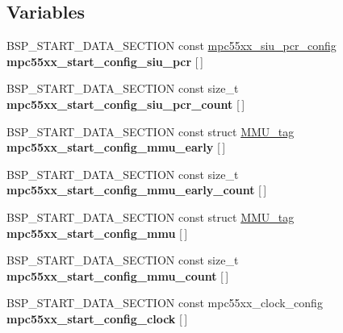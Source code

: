 \subsection*{Variables}
\begin{DoxyCompactItemize}
\item 
\mbox{\label{mpc55xx-config_8h_a443d6d4a936e801c7a529631a9c33840}} 
B\+S\+P\+\_\+\+S\+T\+A\+R\+T\+\_\+\+D\+A\+T\+A\+\_\+\+S\+E\+C\+T\+I\+ON const \mbox{\hyperlink{structmpc55xx__siu__pcr__config}{mpc55xx\+\_\+siu\+\_\+pcr\+\_\+config}} {\bfseries mpc55xx\+\_\+start\+\_\+config\+\_\+siu\+\_\+pcr} \mbox{[}$\,$\mbox{]}
\item 
\mbox{\label{mpc55xx-config_8h_a9d3b967b851fb1bc2a95d2024bd7bb57}} 
B\+S\+P\+\_\+\+S\+T\+A\+R\+T\+\_\+\+D\+A\+T\+A\+\_\+\+S\+E\+C\+T\+I\+ON const size\+\_\+t {\bfseries mpc55xx\+\_\+start\+\_\+config\+\_\+siu\+\_\+pcr\+\_\+count} \mbox{[}$\,$\mbox{]}
\item 
\mbox{\label{mpc55xx-config_8h_a67c08ed695c7bafffe0aadaead287646}} 
B\+S\+P\+\_\+\+S\+T\+A\+R\+T\+\_\+\+D\+A\+T\+A\+\_\+\+S\+E\+C\+T\+I\+ON const struct \mbox{\hyperlink{structMMU__tag}{M\+M\+U\+\_\+tag}} {\bfseries mpc55xx\+\_\+start\+\_\+config\+\_\+mmu\+\_\+early} \mbox{[}$\,$\mbox{]}
\item 
\mbox{\label{mpc55xx-config_8h_adc85f887524427a464036e5744579004}} 
B\+S\+P\+\_\+\+S\+T\+A\+R\+T\+\_\+\+D\+A\+T\+A\+\_\+\+S\+E\+C\+T\+I\+ON const size\+\_\+t {\bfseries mpc55xx\+\_\+start\+\_\+config\+\_\+mmu\+\_\+early\+\_\+count} \mbox{[}$\,$\mbox{]}
\item 
\mbox{\label{mpc55xx-config_8h_a8f1c0da8f516c17a14d0778e7c27b98e}} 
B\+S\+P\+\_\+\+S\+T\+A\+R\+T\+\_\+\+D\+A\+T\+A\+\_\+\+S\+E\+C\+T\+I\+ON const struct \mbox{\hyperlink{structMMU__tag}{M\+M\+U\+\_\+tag}} {\bfseries mpc55xx\+\_\+start\+\_\+config\+\_\+mmu} \mbox{[}$\,$\mbox{]}
\item 
\mbox{\label{mpc55xx-config_8h_a8528957ea23344c0e943f9ffd15d4a5a}} 
B\+S\+P\+\_\+\+S\+T\+A\+R\+T\+\_\+\+D\+A\+T\+A\+\_\+\+S\+E\+C\+T\+I\+ON const size\+\_\+t {\bfseries mpc55xx\+\_\+start\+\_\+config\+\_\+mmu\+\_\+count} \mbox{[}$\,$\mbox{]}
\item 
\mbox{\label{mpc55xx-config_8h_a5c37cdbd3361ee6edbc212ada8224311}} 
B\+S\+P\+\_\+\+S\+T\+A\+R\+T\+\_\+\+D\+A\+T\+A\+\_\+\+S\+E\+C\+T\+I\+ON const mpc55xx\+\_\+clock\+\_\+config {\bfseries mpc55xx\+\_\+start\+\_\+config\+\_\+clock} \mbox{[}$\,$\mbox{]}
\end{DoxyCompactItemize}


